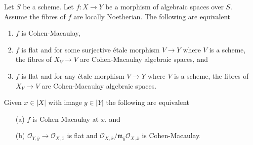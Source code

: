 \begin{lemma}
\label{lemma-CM}
Let $S$ be a scheme. Let $f : X \to Y$ be a morphism of algebraic spaces
over $S$. Assume the fibres of $f$ are locally Noetherian.
The following are equivalent
\begin{enumerate}
\item $f$ is Cohen-Macaulay,
\item $f$ is flat and for some surjective \'etale morphism $V \to Y$
where $V$ is a scheme, the fibres of $X_V \to V$
are Cohen-Macaulay algebraic spaces, and
\item $f$ is flat and for any \'etale morphism $V \to Y$
where $V$ is a scheme, the fibres of $X_V \to V$
are Cohen-Macaulay algebraic spaces.
\end{enumerate}
Given $x \in |X|$ with image $y \in |Y|$ the following are
equivalent
\begin{enumerate}
\item[(a)] $f$ is Cohen-Macaulay at $x$, and
\item[(b)] $\mathcal{O}_{Y, \overline{y}} \to \mathcal{O}_{X, \overline{x}}$
is flat and
$\mathcal{O}_{X, \overline{x}}/
\mathfrak m_{\overline{y}}\mathcal{O}_{X, \overline{x}}$ is Cohen-Macaulay.
\end{enumerate}
\end{lemma}

